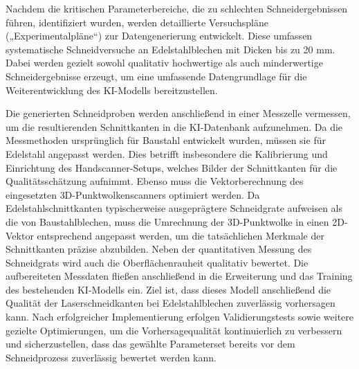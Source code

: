 Nachdem die kritischen Parameterbereiche, die zu schlechten Schneidergebnissen führen, identifiziert wurden, werden detaillierte Versuchspläne („Experimentalpläne“) zur Datengenerierung entwickelt. Diese umfassen systematische Schneidversuche an Edelstahlblechen mit Dicken bis zu 20 \ac{mm}. Dabei werden gezielt sowohl qualitativ hochwertige als auch minderwertige Schneidergebnisse erzeugt, um eine umfassende Datengrundlage für die Weiterentwicklung des KI-Modells bereitzustellen.

Die generierten Schneidproben werden anschließend in einer Messzelle vermessen, um die resultierenden Schnittkanten in die KI-Datenbank aufzunehmen. Da die Messmethoden ursprünglich für Baustahl entwickelt wurden, müssen sie für Edelstahl angepasst werden. Dies betrifft insbesondere die Kalibrierung und Einrichtung des Handscanner-Setups, welches Bilder der Schnittkanten für die Qualitätsschätzung aufnimmt. Ebenso muss die Vektorberechnung des eingesetzten \ac{3D}-Punktwolkenscanners optimiert werden. Da Edelstahlschnittkanten typischerweise ausgeprägtere Schneidgrate aufweisen als die von Baustahlblechen, muss die Umrechnung der \ac{3D}-Punktwolke in einen \ac{2D}-Vektor entsprechend angepasst werden, um die tatsächlichen Merkmale der Schnittkanten präzise abzubilden.
Neben der quantitativen Messung des Schneidgrats wird auch die Oberflächenrauheit qualitativ bewertet.
Die aufbereiteten Messdaten fließen anschließend in die Erweiterung und das Training des bestehenden KI-Modells ein. Ziel ist, dass dieses Modell anschließend die Qualität der Laserschneidkanten bei Edelstahlblechen zuverlässig vorhersagen kann. Nach erfolgreicher Implementierung erfolgen Validierungstests sowie weitere gezielte Optimierungen, um die Vorhersagequalität kontinuierlich zu verbessern und sicherzustellen, dass das gewählte Parameterset bereits vor dem Schneidprozess zuverlässig bewertet werden kann.
